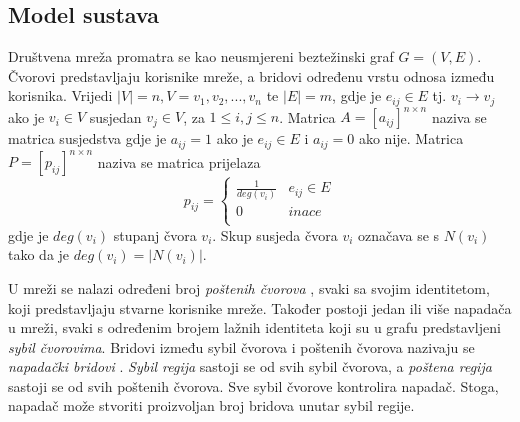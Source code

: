 \documentclass[times, utf8, seminar, numeric]{fer}
\begin{document}
\subsection{Model sustava}
Društvena mreža promatra se kao neusmjereni beztežinski graf $G = (V, E)$. Čvorovi predstavljaju korisnike mreže, a bridovi određenu vrstu odnosa između korisnika. Vrijedi $|V| = n, V = {v_1, v_2, ..., v_n}$ te $|E| = m$, gdje je $e_{ij} \in E$ tj. $v_i \to v_j$ ako je $v_i \in V$ susjedan $v_j \in V$, za $1 \leq i, j \leq n$. Matrica $A = [a_{ij}]^{n \times n}$ naziva se matrica susjedstva gdje je $a_{ij} = 1$ ako je $e_{ij} \in E$ i $a_{ij} = 0$ ako nije. Matrica $P = [p_{ij}]^{n \times n}$ naziva se matrica prijelaza 
\begin{equation} \label{eq:transition}
  p_{ij} = 
  \begin{cases}
    \frac{1}{deg(v_i)} & e_{ij} \in E \\
    0 & inace \\
  \end{cases}
\end{equation}
gdje je $deg(v_i)$ stupanj čvora $v_i$. Skup susjeda čvora $v_i$ označava se s $N(v_i)$ tako da je $deg(v_i) = |N(v_i)|$.

U mreži se nalazi određeni broj \textit{poštenih čvorova} , svaki sa svojim identitetom, koji predstavljaju stvarne korisnike mreže. Također postoji jedan ili više napadača u mreži, svaki s određenim brojem lažnih identiteta koji su u grafu predstavljeni \textit{sybil čvorovima}. Bridovi između sybil čvorova i poštenih čvorova nazivaju se \textit{napadački bridovi} . \textit{Sybil regija}  sastoji se od svih sybil čvorova, a \textit{poštena regija}  sastoji se od svih poštenih čvorova. Sve sybil čvorove kontrolira napadač. Stoga, napadač može stvoriti proizvoljan broj bridova unutar sybil regije.
\end{document}
